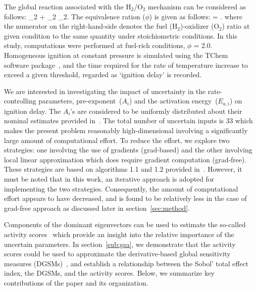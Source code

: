 The global reaction associated with the H$_2$/O$_2$ mechanism can
be considered as follows:
%
_2 + _2 _2.
\label{eq:global}
\ee 
%
The equivalence ration ($\phi$) is given as follows:
%
\be
\phi = .
\label{eq:phi}
\ee
%
where the numerator on the right-hand-side denotes the fuel (H$_2$)-oxidizer (O$_2$) ratio at given
condition to the same quantity under stoichiometric conditions. In this study, computations were performed
at fuel-rich conditions, $\phi$ = 2.0. Homogeneous ignition at constant pressure is simulated using the
TChem software package~\cite{Safta:2011}, and the time required for the rate of temperature increase
to exceed a given threshold, regarded as `ignition delay' is recorded. 

We are interested in investigating the impact of uncertainty in the rate-controlling parameters, 
pre-exponent~($A_i$) and the activation energy~($E_{a,i}$) on ignition delay. The $A_i$'s are
considered to be uniformly distributed about their nominal estimates provided in~\cite{Yetter:1991}.
The total number of uncertain inputs is 33 which makes the
present problem reasonably high-dimensional involving a significantly large amount of computational
effort. To reduce the effort, we explore two strategies: one involving the use of gradients (grad-based)
and the other involving local linear approximation which does require gradient computation (grad-free).
These strategies are based on algorithms 1.1 and 1.2 provided  in~\cite{Constantine:2015}. However, it
must be noted that in this work, an iterative approach is adopted for implementing the two strategies.
Consequently, the amount of computational effort appears to have decreased, and is found to be
relatively less in the case of grad-free approach as discussed later in section~\ref{sec:method}.

Components of the dominant eigenvectors can be used to estimate the so-called 
activity scores~\cite{Diaz:2016,Constantine:2017} which provide an insight into the relative importance
of the uncertain parameters. In 
section~\ref{sub:gsa}, we demonstrate that the activity scores could be used to approximate the 
derivative-based global sensitivity measures (DGSMs)~\cite{Sobol:2009}, and establish a relationship between
the Sobol' total effect index, the DGSMs, and the activity scores. Below, we summarize key contributions of
the paper and its organization. 

